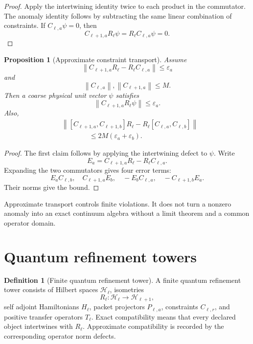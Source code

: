 \documentclass{aomart}
\newtheorem{proposition}[proposition]{Proposition}
\theoremstyle{definition}
\newtheorem{definition}[definition]{Definition}
\theoremstyle{remark}
\newcommand{\Hcal}{\mathcal H}
\newcommand{\norm}[1]{\left\lVert#1\right\rVert}
\begin{document}
\begin{proof}
Apply the intertwining identity twice to each product in the commutator. The anomaly identity follows by subtracting the same linear combination of constraints. If \(C_{\ell,a}\psi=0\), then
\[
C_{\ell+1,a}R_\ell\psi=R_\ell C_{\ell,a}\psi=0.
\]
\end{proof}

\begin{proposition}[Approximate constraint transport]\label{prop:approx_constraint_transport}
Assume
\[
\norm{C_{\ell+1,a}R_\ell-R_\ell C_{\ell,a}}
\leq\varepsilon_a
\]
and
\[
\norm{C_{\ell,a}},\norm{C_{\ell+1,a}}\leq M.
\]
Then a coarse physical unit vector \(\psi\) satisfies
\[
\norm{C_{\ell+1,a}R_\ell\psi}\leq\varepsilon_a.
\]
Also,
\[
\begin{aligned}
&\norm{
[C_{\ell+1,a},C_{\ell+1,b}]R_\ell
-R_\ell[C_{\ell,a},C_{\ell,b}]
}\\
&\hspace{4em}\leq
2M(\varepsilon_a+\varepsilon_b).
\end{aligned}
\]
\end{proposition}

\begin{proof}
The first claim follows by applying the intertwining defect to \(\psi\). Write
\[
E_a=C_{\ell+1,a}R_\ell-R_\ell C_{\ell,a}.
\]
Expanding the two commutators gives four error terms:
\[
E_aC_{\ell,b},
\quad
C_{\ell+1,a}E_b,
\quad
-E_bC_{\ell,a},
\quad
-C_{\ell+1,b}E_a.
\]
Their norms give the bound.
\end{proof}

Approximate transport controls finite violations. It does not turn a nonzero anomaly into an exact continuum algebra without a limit theorem and a common operator domain.

\section{Quantum refinement towers}\label{sec:towers}

\begin{definition}[Finite quantum refinement tower]\label{def:quantum_tower}
A finite quantum refinement tower consists of Hilbert spaces \(\Hcal_\ell\), isometries
\[
R_\ell:\Hcal_\ell\longrightarrow\Hcal_{\ell+1},
\]
self adjoint Hamiltonians \(H_\ell\), packet projectors \(P_{\ell,a}\), constraints \(C_{\ell,r}\), and positive transfer operators \(T_\ell\). Exact compatibility means that every declared object intertwines with \(R_\ell\). Approximate compatibility is recorded by the corresponding operator norm defects.
\end{definition}
\end{document}
